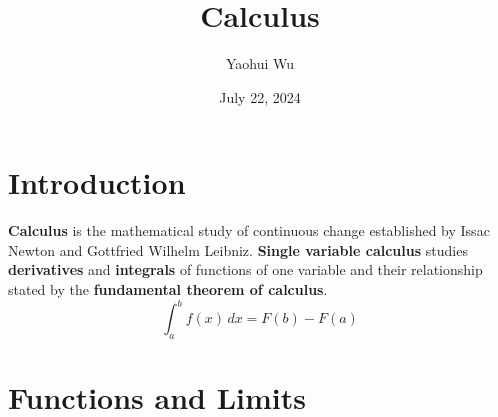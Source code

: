 \documentclass[12pt]{article}
\title{Calculus}
\author{Yaohui Wu}
\date{July 22, 2024}
\begin{document}
\maketitle

\section*{Introduction}
\textbf{Calculus} is the mathematical study of continuous change established
by Issac Newton and Gottfried Wilhelm Leibniz.
\textbf{Single variable calculus} studies \textbf{derivatives} and
\textbf{integrals} of functions of one variable and their relationship stated
by the \textbf{fundamental theorem of calculus}.
\[\int_a^b f(x)\,dx=F(b)-F(a)\]

\tableofcontents
\newpage

\section{Functions and Limits}






% 
% 
% 
% 
% 

% 
% 
% 
% 

% 
% 
% 
% 
\end{document}
